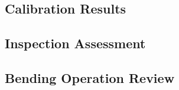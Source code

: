 \subsection{Calibration Results}
\label{subsec:calibration-results}


\subsection{Inspection Assessment}
\label{subsec:inspection-assessment}


\subsection{Bending Operation Review}
\label{subsec:calibration-results}


